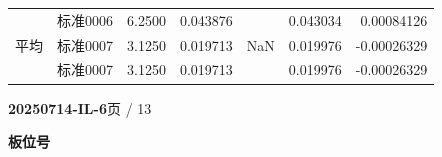 \documentclass[UTF8,10pt,a4paper,fontset=fandol]{ctexart}
\newcommand{\fieldvalue}[1]{#1}
\begin{document}
\begin{tabularx}{\textwidth}{l l r r r r r}
&
\fieldvalue{标准0006} &
\fieldvalue{6.2500} &
\fieldvalue{0.043876} & &
\fieldvalue{0.043034} &
\fieldvalue{0.00084126} \\

平均 &
\fieldvalue{标准0007} &
\fieldvalue{3.1250} &
\fieldvalue{0.019713} &
\fieldvalue{NaN} &
\fieldvalue{0.019976} &
\fieldvalue{-0.00026329} \\

&
\fieldvalue{标准0007} &
\fieldvalue{3.1250} &
\fieldvalue{0.019713} & &
\fieldvalue{0.019976} &
\fieldvalue{-0.00026329}
\end{tabularx}
\normalsize

\newpage

\noindent\textbf{20250714-IL-6}\hfill 页 / 13

\medskip
\noindent\textbf{板位号}
\end{document}
